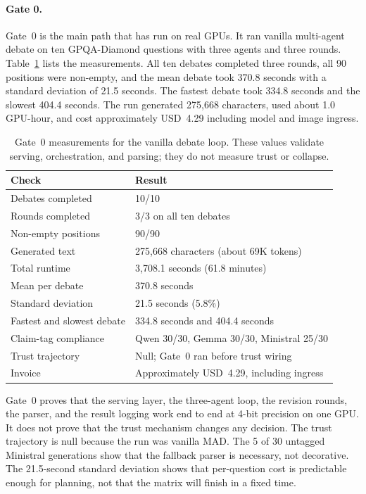 \paragraph*{Gate 0.}
Gate~0 is the main path that has run on real GPUs. It ran vanilla multi-agent debate on ten GPQA-Diamond questions with three agents and three rounds. Table~\ref{tab:gate0} lists the measurements. All ten debates completed three rounds, all 90 positions were non-empty, and the mean debate took 370.8 seconds with a standard deviation of 21.5 seconds. The fastest debate took 334.8 seconds and the slowest 404.4 seconds. The run generated 275{,}668 characters, used about 1.0 GPU-hour, and cost approximately USD~4.29 including model and image ingress.

\begin{table}[H]
  \centering
  \caption{Gate~0 measurements for the vanilla debate loop. These values validate serving, orchestration, and parsing; they do not measure trust or collapse.}
  \renewcommand{\arraystretch}{1.25}
  \small
  \begin{tabular}{|p{}|p{}|}
    \hline
    Check & Result \\
    \hline
    Debates completed & 10/10 \\
    \hline
    Rounds completed & 3/3 on all ten debates \\
    \hline
    Non-empty positions & 90/90 \\
    \hline
    Generated text & 275{,}668 characters (about 69K tokens) \\
    \hline
    Total runtime & 3{,}708.1 seconds (61.8 minutes) \\
    \hline
    Mean per debate & 370.8 seconds \\
    \hline
    Standard deviation & 21.5 seconds (5.8\%) \\
    \hline
    Fastest and slowest debate & 334.8 seconds and 404.4 seconds \\
    \hline
    Claim-tag compliance & Qwen 30/30, Gemma 30/30, Ministral 25/30 \\
    \hline
    Trust trajectory & Null; Gate~0 ran before trust wiring \\
    \hline
    Invoice & Approximately USD~4.29, including ingress \\
    \hline
  \end{tabular}
  \label{tab:gate0}
\end{table}

Gate~0 proves that the serving layer, the three-agent loop, the revision rounds, the parser, and the result logging work end to end at 4-bit precision on one GPU. It does not prove that the trust mechanism changes any decision. The trust trajectory is null because the run was vanilla MAD. The 5 of 30 untagged Ministral generations show that the fallback parser is necessary, not decorative. The 21.5-second standard deviation shows that per-question cost is predictable enough for planning, not that the matrix will finish in a fixed time.

